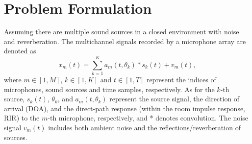 \documentclass[lettersize,journal]{IEEEtran}
\begin{document}

\section{Problem Formulation}\label{sec:Formulation}
Assuming there are multiple sound sources in a closed environment with noise and reverberation. 
The multichannel signals recorded by a microphone array are denoted as
\begin{equation}
x_m(t)=\sum_{k=1}^K a_m\left(t,\theta_k\right)*s_k(t)+v_m(t),
\end{equation}
where $m \in[1, M]$, $k \in[1, K]$ and $t \in[1, T]$ represent the indices of microphones, sound sources and time samples, respectively. 
As for the $k$-th source, $s_k(t)$, $\theta_k$, and $a_m\left(t, \theta_k\right)$ represent the source signal, the direction of arrival (DOA), and the direct-path response (within the room impulse response, RIR) to the $m$-th microphone, respectively, and * denotes convolution. The noise signal $v_m(t)$ includes both ambient noise and the reflections/reverberation of sources.
\end{document}
